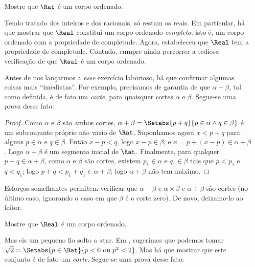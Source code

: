 \documentclass[../../../include/open-logic-section]{subfiles}
\begin{document}
\begin{prob}
Mostre que $\Rat$ é um corpo ordenado.
\end{prob}

Tendo tratado dos inteiros e dos racionais, só restam os reais. Em particular,
há que mostrar que $\Real$ constitui um corpo ordenado \emph{completo}, isto é, um
corpo ordenado com a propriedade de completude. Agora,
 estabeleceu que $\Real$ tem a propriedade de
completude. Contudo, cumpre ainda percorrer a tediosa verificação de que $\Real$ é
um corpo ordenado.

Antes de nos lançarmos a \emph{esse} exercício laborioso, há que confirmar algumas
coisas mais ``imediatas''. Por exemplo, precisamos de garantia de que
$\alpha + \beta$, tal como definida, é de fato um \emph{corte}, para quaisquer
cortes $\alpha$ e $\beta$. Segue-se uma prova desse fato:

\begin{proof}	
Como $\alpha$ e $\beta$ são ambos cortes, $\alpha + \beta = \Setabs{p
+ q}{p \in \alpha \land q \in \beta}$ é um subconjunto próprio não vazio de
$\Rat$. Suponhamos agora $x < p + q$ para alguns $p \in \alpha$ e $q \in \beta$.
Então $x - p < q$, logo $x - p \in \beta$, e $x = p + (x - p) \in
\alpha + \beta$. Logo $\alpha + \beta$ é um segmento inicial de $\Rat$.
Finalmente, para qualquer $p + q \in \alpha + \beta$, como $\alpha$ e
$\beta$ são cortes, existem $p_1 \in \alpha$ e $q_1 \in \beta$
tais que $p < p_1$ e $q < q_1$; logo $p + q < p_1 + q_1 \in \alpha +
\beta$; logo $\alpha + \beta$ não tem máximo. 
\end{proof}

Esforços semelhantes permitem verificar que $\alpha - \beta$ e
$\alpha \times \beta$ e $\alpha \div \beta$ são cortes (no último
caso, ignorando o caso em que $\beta$ é o corte zero). De novo, deixamo-lo ao
leitor.

\begin{prob}
Mostre que $\Real$ é um corpo ordenado.
\end{prob}

Mas eis um pequeno fio solto a atar. Em
, sugerimos que podemos tomar $\sqrt{2} =
\Setabs{p \in \Rat}{p < 0 \text{ ou }p^2 < 2}$. Mas há que mostrar
que este conjunto é de fato um \emph{corte}. Segue-se uma prova desse fato:
\end{document}
